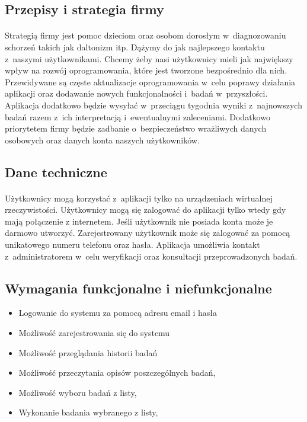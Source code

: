 \documentclass[12pt, letterpaper]{article}
\begin{document}
\subsection{Przepisy i strategia firmy}
\paragraph{}	
Strategią firmy jest pomoc dzieciom oraz osobom dorosłym w~diagnozowaniu schorzeń takich jak daltonizm itp. Dążymy do jak najlepszego kontaktu z~naszymi użytkownikami. Chcemy żeby nasi użytkownicy mieli jak największy wpływ na rozwój oprogramowania, które jest tworzone bezpośrednio dla nich. Przewidywane są częste aktualizacje oprogramowania w~celu poprawy działania aplikacji oraz dodawanie nowych funkcjonalności i~badań w~przyszłości. Aplikacja dodatkowo będzie wysyłać w~przeciągu tygodnia wyniki z~najnowszych badań razem z~ich interpretacją i~ewentualnymi zaleceniami. Dodatkowo priorytetem firmy będzie zadbanie o~bezpieczeństwo wrażliwych danych osobowych oraz danych konta naszych użytkowników.
	

\subsection{Dane techniczne}
\paragraph{}	
Użytkownicy mogą korzystać z~aplikacji tylko na urządzeniach wirtualnej rzeczywistości. Użytkownicy mogą się zalogować do aplikacji tylko wtedy gdy mają połączenie z internetem. Jeśli użytkownik nie posiada konta może je darmowo utworzyć. Zarejestrowany użytkownik może się zalogować za pomocą unikatowego numeru telefonu oraz hasła. Aplikacja umożliwia kontakt z~administratorem w~celu weryfikacji oraz konsultacji przeprowadzonych badań.
	
\newpage		
\subsection{Wymagania funkcjonalne i niefunkcjonalne}

		
			\begin{itemize}
				\item Logowanie do systemu za pomocą adresu email i hasła
				\item Możliwość zarejestrowania się do systemu
				\item Możliwość przeglądania historii badań
				\item Możliwość przeczytania opisów poszczególnych badań,
				\item Możliwość wyboru badań z listy,
				\item Wykonanie badania wybranego z listy,
			\end{itemize}
			
\end{document}

